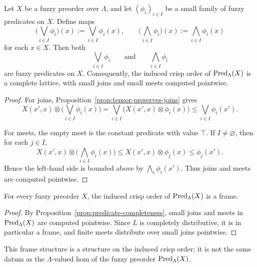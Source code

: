 \begin{proposition}
\label{prop:predicate-completeness}
    Let \(X\) be a fuzzy preorder over \(\Lambda\), and let \((\phi_i)_{i\in I}\) be a small family of fuzzy predicates on \(X\). Define maps
    \[
        \Big(\bigvee_{i\in I}\phi_i\Big)(x)
        :=
        \bigvee_{i\in I}\phi_i(x),
        \qquad
        \Big(\bigwedge_{i\in I}\phi_i\Big)(x)
        :=
        \bigwedge_{i\in I}\phi_i(x)
    \]
    for each \(x\in X\). Then both
    \[
        \bigvee_{i\in I}\phi_i
        \qquad\text{and}\qquad
        \bigwedge_{i\in I}\phi_i
    \]
    are fuzzy predicates on \(X\). Consequently, the induced crisp order of \(\mathrm{Pred}_\Lambda(X)\) is a complete lattice, with small joins and small meets computed pointwise.
\end{proposition}

\begin{proof}
    For joins, Proposition~\ref{prop:tensor-preserves-joins} gives
    \[
        X(x',x)\otimes
        \Big(\bigvee_{i\in I}\phi_i(x)\Big)
        =
        \bigvee_{i\in I}
        \bigl(X(x',x)\otimes \phi_i(x)\bigr)
        \leq
        \bigvee_{i\in I}\phi_i(x').
    \]

    For meets, the empty meet is the constant predicate with value \(\top\). If \(I\neq\varnothing\), then for each \(j\in I\),
    \[
        X(x',x)\otimes
        \Big(\bigwedge_{i\in I}\phi_i(x)\Big)
        \leq
        X(x',x)\otimes \phi_j(x)
        \leq
        \phi_j(x').
    \]
    Hence the left-hand side is bounded above by \(\bigwedge_i\phi_i(x')\). Thus joins and meets are computed pointwise.
\end{proof}

\begin{proposition}
\label{prop:predicate-frame}
    For every fuzzy preorder \(X\), the induced crisp order of \(\mathrm{Pred}_\Lambda(X)\) is a frame.
\end{proposition}

\begin{proof}
    By Proposition~\ref{prop:predicate-completeness}, small joins and meets in \(\mathrm{Pred}_\Lambda(X)\) are computed pointwise. Since \(L\) is completely distributive, it is in particular a frame, and finite meets distribute over small joins pointwise.
\end{proof}

This frame structure is a structure on the induced crisp order; it is not the same datum as the \(\Lambda\)-valued hom of the fuzzy preorder \(\mathrm{Pred}_\Lambda(X)\).

